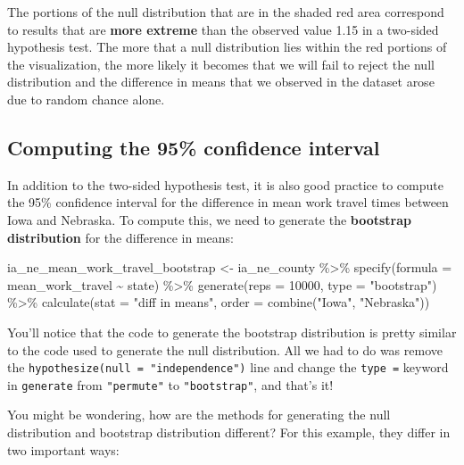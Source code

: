 \documentclass[
]{book}
\newenvironment{Shaded}{\begin{snugshade}}{\end{snugshade}}
\newcommand{\AttributeTok}[1]{\textcolor[rgb]{0.77,0.63,0.00}{#1}}
\newcommand{\DecValTok}[1]{\textcolor[rgb]{0.00,0.00,0.81}{#1}}
\newcommand{\FunctionTok}[1]{\textcolor[rgb]{0.00,0.00,0.00}{#1}}
\newcommand{\NormalTok}[1]{#1}
\newcommand{\OtherTok}[1]{\textcolor[rgb]{0.56,0.35,0.01}{#1}}
\newcommand{\SpecialCharTok}[1]{\textcolor[rgb]{0.00,0.00,0.00}{#1}}
\newcommand{\StringTok}[1]{\textcolor[rgb]{0.31,0.60,0.02}{#1}}
\begin{document}
The portions of the null distribution that are in the shaded red area correspond to results that are \textbf{more extreme} than the observed value 1.15 in a two-sided hypothesis test.
The more that a null distribution lies within the red portions of the visualization, the more likely it becomes that we will fail to reject the null distribution and the difference in means that we observed in the dataset arose due to random chance alone.

\hypertarget{computing-the-95-confidence-interval}{%
\subsection{Computing the 95\% confidence interval}\label{computing-the-95-confidence-interval}}

In addition to the two-sided hypothesis test, it is also good practice to compute the 95\% confidence interval for the difference in mean work travel times between Iowa and Nebraska.
To compute this, we need to generate the \textbf{bootstrap distribution} for the difference in means:

\begin{Shaded}
\begin{Highlighting}[]
\NormalTok{ia\_ne\_mean\_work\_travel\_bootstrap }\OtherTok{\textless{}{-}}\NormalTok{ ia\_ne\_county }\SpecialCharTok{\%\textgreater{}\%}
  \FunctionTok{specify}\NormalTok{(}\AttributeTok{formula =}\NormalTok{ mean\_work\_travel }\SpecialCharTok{\textasciitilde{}}\NormalTok{ state) }\SpecialCharTok{\%\textgreater{}\%}
  \FunctionTok{generate}\NormalTok{(}\AttributeTok{reps =} \DecValTok{10000}\NormalTok{, }\AttributeTok{type =} \StringTok{"bootstrap"}\NormalTok{) }\SpecialCharTok{\%\textgreater{}\%}
  \FunctionTok{calculate}\NormalTok{(}\AttributeTok{stat =} \StringTok{"diff in means"}\NormalTok{, }\AttributeTok{order =} \FunctionTok{combine}\NormalTok{(}\StringTok{"Iowa"}\NormalTok{, }\StringTok{"Nebraska"}\NormalTok{))}
\end{Highlighting}
\end{Shaded}

You'll notice that the code to generate the bootstrap distribution is pretty similar to the code used to generate the null distribution.
All we had to do was remove the \texttt{hypothesize(null\ =\ "independence")} line and change the \texttt{type\ =} keyword in \texttt{generate} from \texttt{"permute"} to \texttt{"bootstrap"}, and that's it!

You might be wondering, how are the methods for generating the null distribution and bootstrap distribution different?
For this example, they differ in two important ways:
\end{document}
